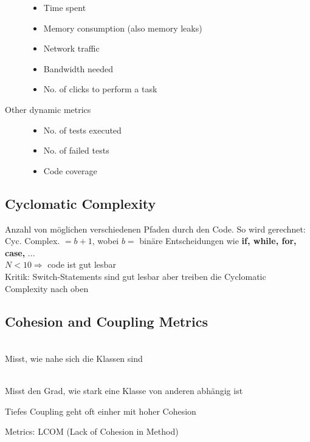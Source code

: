 \documentclass[a4paper,10pt]{article}
\newcommand{\Bold}[1]{\textbf{#1}} %
\newcommand{\Ra}{\Rightarrow}
\begin{document}
\begin{description}
		\begin{itemize}
			\item Time spent
			\item Memory consumption (also memory leaks)
			\item Network traffic
			\item Bandwidth needed
			\item No. of clicks to perform a task
		\end{itemize}
	\item[Other dynamic metrics] \hfill 
		\begin{itemize}
			\item No. of tests executed
			\item No. of failed tests
			\item Code coverage
		\end{itemize}
\end{description}

\subsection{Cyclomatic Complexity}
Anzahl von möglichen verschiedenen Pfaden durch den Code. So wird gerechnet:
Cyc. Complex. $= b + 1$, wobei $b =$ binäre Entscheidungen wie \Bold {if, while, for, case,} ...\\
$N < 10 \Ra $ code ist gut lesbar\\
Kritik: Switch-Statements sind gut lesbar aber treiben die Cyclomatic Complexity nach oben

\subsection{Cohesion and Coupling Metrics}
\begin{description}
	\item[Cohesion] \hfill \\
		Misst, wie nahe sich die Klassen sind
	\item[Coupling / Dependency] \hfill \\
		Misst den Grad, wie stark eine Klasse von anderen abhängig ist
	\item Tiefes Coupling geht oft einher mit hoher Cohesion
	\item Metrics: LCOM (Lack of Cohesion in Method)
\end{description}
\end{document}
